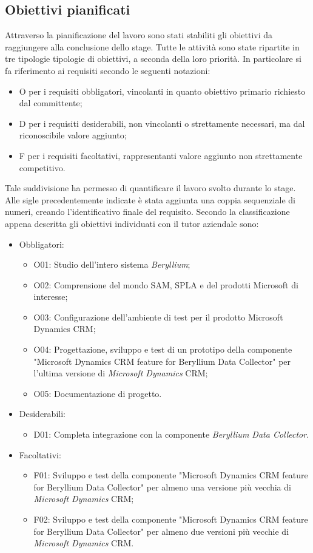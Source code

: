 \subsection{Obiettivi pianificati}
Attraverso la pianificazione del lavoro sono stati stabiliti gli obiettivi da raggiungere alla conclusione dello stage. 
Tutte le attività sono state ripartite in tre tipologie tipologie di obiettivi, a seconda della loro priorità. 
In particolare si fa riferimento ai requisiti secondo le seguenti notazioni:
\begin{itemize}
    \item O per i requisiti obbligatori, vincolanti in quanto obiettivo primario richiesto dal committente;
    \item D per i requisiti desiderabili, non vincolanti o strettamente necessari, ma dal riconoscibile valore aggiunto;
    \item F per i requisiti facoltativi, rappresentanti valore aggiunto non strettamente competitivo.
\end{itemize}
Tale suddivisione ha permesso di quantificare il lavoro svolto durante lo stage. 
Alle sigle precedentemente indicate è stata aggiunta una coppia sequenziale di numeri, creando l’identificativo finale del requisito.
Secondo la classificazione appena descritta gli obiettivi individuati con il tutor aziendale sono:
\begin{itemize}
    \item Obbligatori:
    \begin{itemize}
        \item O01: Studio dell’intero sistema \emph{Beryllium};
        \item O02: Comprensione del mondo SAM, SPLA e del prodotti Microsoft di interesse;
        \item O03: Configurazione dell’ambiente di test per il prodotto Microsoft Dynamics CRM;
        \item O04: Progettazione, sviluppo e test di un prototipo della componente "Microsoft Dynamics CRM feature for Beryllium Data Collector" per l’ultima versione di \emph{Microsoft Dynamics} CRM;
        \item O05: Documentazione di progetto.
    \end{itemize}
    \item Desiderabili:
    \begin{itemize}
        \item D01: Completa integrazione con la componente \emph{Beryllium Data Collector}.
    \end{itemize}
    \item Facoltativi:
    \begin{itemize}
        \item F01: Sviluppo e test della componente "Microsoft Dynamics CRM feature for Beryllium Data Collector" per almeno una versione più vecchia di \emph{Microsoft Dynamics} CRM;
        \item F02: Sviluppo e test della componente "Microsoft Dynamics CRM feature for Beryllium Data Collector" per almeno due versioni più vecchie di \emph{Microsoft Dynamics} CRM.
    \end{itemize}
\end{itemize}
